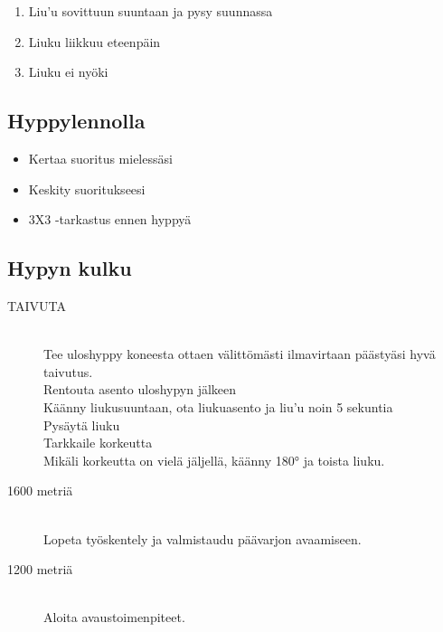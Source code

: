 \begin{multicols}{2}
\begin{enumerate}[label=\bfseries \arabic*)]
\item  Liu'u sovittuun suuntaan ja pysy suunnassa 
\item  Liuku liikkuu eteenpäin 
\item  Liuku ei nyöki 
\end{enumerate}
\subsection{ Hyppylennolla }
\label{peruskoulutuksen-muut-suoritukset-hyppylennolla}

\begin{itemize}
\item Kertaa suoritus mielessäsi 
\item Keskity suoritukseesi 
\item 3X3 -tarkastus ennen hyppyä 
\end{itemize}
\subsection{ Hypyn kulku }
\label{peruskoulutuksen-muut-suoritukset-hypyn-kulku}

\begin{description}
\item[TAIVUTA] \hfill \\ 
Tee uloshyppy koneesta ottaen välittömästi ilmavirtaan päästyäsi hyvä taivutus. \hfill \\ 
Rentouta asento uloshypyn jälkeen \hfill \\ 
Käänny liukusuuntaan, ota liukuasento ja liu'u noin 5 sekuntia \hfill \\ 
Pysäytä liuku \hfill \\ 
Tarkkaile korkeutta \hfill \\ 
Mikäli korkeutta on vielä jäljellä, käänny 180° ja toista liuku. \hfill \\ 
\item[1600 metriä] \hfill \\ 
Lopeta työskentely ja valmistaudu päävarjon avaamiseen.  \hfill \\ 
\item[1200 metriä] \hfill \\ 
Aloita avaustoimenpiteet. \hfill \\ 
\end{description}

\end{multicols}\pagebreak\begin{multicols}{2} 


\end{multicols}
